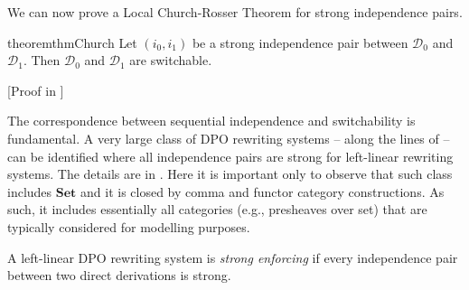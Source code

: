 \documentclass[a4paper,UKenglish,cleveref,pdftex, thm-restate,numberwithinsect,anonymous]{lipics}
\newcommand{\cat}[1]{\ensuremath{\mathbf{#1}}}
\newcommand{\dder}[1]{\mathscr{#1}}
\newcommand{\rem}[2]{{\color{blue}#1}{\color{red}#2}}
\renewcommand{\rem}[2]{}
\begin{document}


We can now prove a Local Church-Rosser Theorem for strong independence pairs.


\begin{restatable}{theorem}{thmChurch}
  \label{thm:church}
  Let $(i_0, i_1)$ be a strong independence pair
  between $\dder{D}_0$ and $\dder{D}_1$. Then $\dder{D}_0$ and
  $\dder{D}_1$ are switchable.
\end{restatable}
[Proof in ]





The correspondence between sequential independence and switchability
is fundamental.  A very large class of DPO rewriting systems -- along the
lines of \cite{baldan2011adhesivity} -- can be identified where all
independence pairs are strong for left-linear rewriting systems. The details are in 
. Here it is important only to observe that such class includes $\cat{Set}$ and it is closed by comma and functor category constructions. 
As such, it includes essentially all categories (e.g., presheaves over set) that are typically considered for modelling purposes.



\begin{definition}A left-linear DPO rewriting system is \emph{strong enforcing} if every independence pair between two direct derivations is strong.
\end{definition}
\end{document}
